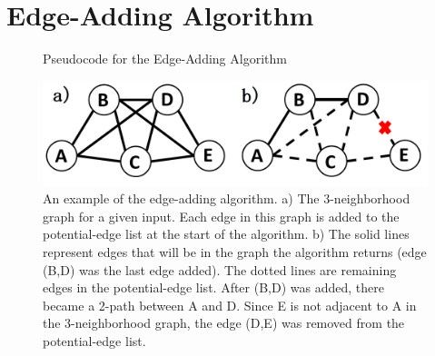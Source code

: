 \section{Edge-Adding Algorithm}


\begin{figure}[htb]
	\begin{algorithmic}
		\tiny
		\renewcommand{\algorithmicrequire}{\textbf{Input:}}
		\renewcommand{\algorithmicensure}{\textbf{Output:}}
			\EndIf
			\EndIf
		\EndWhile
	\end{algorithmic}
	\caption{Pseudocode for the Edge-Adding Algorithm}

\end{figure}

\begin{figure}[htb]
\centerline{\includegraphics[scale=0.2]{profs_example.png}}
	\caption{An example of the edge-adding algorithm. a) The 3-neighborhood graph for a given input. Each edge in this graph is added to the potential-edge list at the start of the algorithm. b) The solid lines represent edges that will be in the graph the algorithm returns (edge (B,D) was the last edge added). The dotted lines are remaining edges in the potential-edge list. After (B,D) was added, there became a 2-path between A and D. Since E is not adjacent to A in the 3-neighborhood graph, the edge (D,E) was removed from the potential-edge list.}
	\label{fig:edge-adding}
\end{figure}



